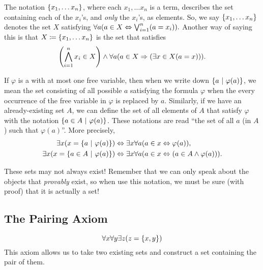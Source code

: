 \begin{definition}\label{not:setbuilder}
    The notation \(\set*{x_1, \dots x_n}\),
    where each \(x_1, \dots x_n\) is a term, 
    describes the set containing each of the \(x_i\)'s, and \emph{only} the \(x_i\)'s, as elements.
    So, we say \(\set*{x_1, \dots x_n}\) denotes the set \(X\) satisfying
    \(
        \forall a \pn*{a \in X \iff \bigjoin_{i = 1}^{n}\pn*{a = x_i}}.
    \)
    Another way of saying this is that \(X \defn \set*{x_1, \dots x_n}\) is the set that satisfies
    \[
        \pn*{\bigmeet_{i = 1}^{n}x_i \in X}
             \meet \forall a \pn*{a \in X \implies \pn*{\exists x \in X \pn*{a = x}}}.
    \]
\end{definition}

\begin{definition}
    If \(\varphi\) is a {\wff} with at most one free variable,
    then when we write down \(\set*{a \suchthat \varphi(a)}\),
    we mean the set consisting of all possible \(a\) satisfying the formula \(\varphi\)
    when the every occurrence of the free variable in \(\varphi\) is replaced by \(a\).
    Similarly, if we have an already-existing set \(A\),
    we can define the set of all elements of \(A\) that satisfy \(\varphi\)
    with the notation \(\set*{a \in A \suchthat \varphi(a)}\).
    These notations are read ``the set of all \(a\) (in \(A\)) such that \(\varphi(a)\)''.
    More precisely,
    \begin{align*}
        \exists x \pn*{x = \set*{a \suchthat \varphi(a)}}
            &\iff \exists x \forall a \pn*{a \in x \iff \varphi(a)},\\
        \exists x \pn*{x = \set*{a  \in A \suchthat \varphi(a)}}
            &\iff \exists x \forall a \pn*{a \in x \iff \pn*{a \in A \meet \varphi(a)}}.
    \end{align*}

    \begin{note}
        These sets may not always exist!
        Remember that we can only speak about the objects that \emph{provably} exist,
        so when use this notation,
        we must be sure (with proof) that it is actually a set!
    \end{note}
\end{definition}

\subsection{The Pairing Axiom}
\begin{axiom}[Pairing]\label{ax:pairing}
    \vspace{-\abovedisplayskip}
    \[\forall x \forall y \exists z \pn*{z = \set*{x, y}}\]
    This axiom allows us to take two existing sets and construct a set containing the pair of them.
\end{axiom}

